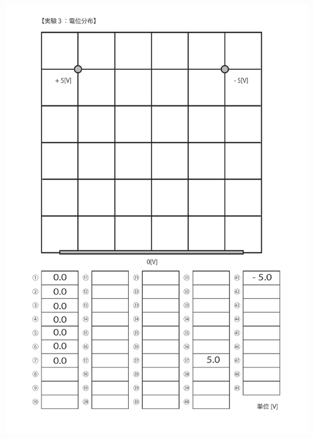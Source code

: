\documentclass[uplatex,a4paper,11pt,oneside,openany]{jsbook}
\begin{document}
\includegraphics[scale=0.8]{./figure/E11.pdf}

\newpage
\end{document}
